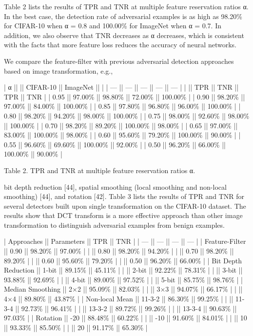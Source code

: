 \documentclass{article}
\begin{document}
Table 2 lists the results of TPR and TNR at multiple feature reservation ratios α. In the best case, the detection rate of adversarial examples is as high as 98.20\% for CIFAR-10 when α = 0.8 and 100.00\% for ImageNet when α = 0.7. In addition, we also observe that TNR decreases as α decreases, which is consistent with the facts that more feature loss reduces the accuracy of neural networks.

We compare the feature-filter with previous adversarial detection approaches based on image transformation, e.g.,

| α    ||        || CIFAR-10 || ImageNet ||         |
| ---  || ---    || ---      || ---      || ---     |
|      || TPR    || TNR      || TPR      || TNR     |
| 0.95 || 97.00\% || 98.80\%   || 72.00\%   || 100.00\% |
| 0.90 || 98.20\% || 97.00\%   || 84.00\%   || 100.00\% |
| 0.85 || 97.80\% || 96.80\%   || 96.00\%   || 100.00\% |
| 0.80 || 98.20\% || 94.20\%   || 98.00\%   || 100.00\% |
| 0.75 || 98.00\% || 92.60\%   || 98.00\%   || 100.00\% |
| 0.70 || 98.20\% || 89.20\%   || 100.00\%  || 98.00\%  |
| 0.65 || 97.00\% || 83.00\%   || 100.00\%  || 98.00\%  |
| 0.60 || 95.60\% || 79.20\%   || 100.00\%  || 90.00\%  |
| 0.55 || 96.60\% || 69.60\%   || 100.00\%  || 92.00\%  |
| 0.50 || 96.20\% || 66.00\%   || 100.00\%  || 90.00\%  |

Table 2. TPR and TNR at multiple feature reservation ratios α.

bit depth reduction [44], spatial smoothing (local smoothing and non-local smoothing) [44], and rotation [42]. Table 3 lists the results of TPR and TNR for several detectors built upon single transformation on the CIFAR-10 dataset. The results show that DCT transform is a more effective approach than other image transformation to distinguish adversarial examples from benign examples.

| Approaches          || Parameters || TPR    || TNR    |
| ---                 || ---        || ---    || ---    |
| Feature-Filter      || 0.90       || 98.20\% || 97.00\% |
|                     || 0.80       || 98.20\% || 94.20\% |
|                     || 0.70       || 98.20\% || 89.20\% |
|                     || 0.60       || 95.60\% || 79.20\% |
|                     || 0.50       || 96.20\% || 66.00\% |
| Bit Depth Reduction || 1-bit      || 89.15\% || 45.11\% |
|                     || 2-bit      || 92.22\% || 78.31\% |
|                     || 3-bit      || 93.88\% || 92.69\% |
|                     || 4-bit      || 89.00\% || 97.52\% |
|                     || 5-bit      || 85.75\% || 98.76\% |
| Median Smoothing    || 2×2        || 95.09\% || 82.03\% |
|                     || 3×3        || 94.07\% || 66.17\% |
|                     || 4×4        || 89.80\% || 43.87\% |
| Non-local Mean      || 11-3-2     || 86.30\% || 99.25\% |
|                     || 11-3-4     || 92.73\% || 96.41\% |
|                     || 13-3-2     || 89.72\% || 99.26\% |
|                     || 13-3-4     || 90.63\% || 97.03\% |
| Rotation            || -20        || 88.48\% || 60.22\% |
|                     || -10        || 91.60\% || 84.01\% |
|                     || 10         || 93.33\% || 85.50\% |
|                     || 20         || 91.17\% || 65.30\% |
\end{document}
